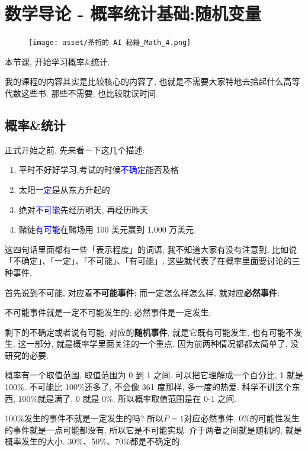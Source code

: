\chapter{数学导论 - 概率统计基础:随机变量}
\begin{figure}[ht]
  \centering
  \texttt{[image: asset/茶桁的 AI 秘籍\_Math\_4.png]}
\end{figure}
\newpage

本节课, 开始学习概率\&统计. 

我的课程的内容其实是比较核心的内容了, 也就是不需要大家特地去拾起什么高等代数这些书. 那些不需要, 也比较耽误时间. 

\section{概率\&统计}

正式开始之前, 先来看一下这几个描述:

\begin{enumerate}
  \item 平时不好好学习,考试的时候\textcolor{blue}{不确定}能否及格
  \item 太阳\textcolor{blue}{一定}是从东方升起的
  \item 绝对\textcolor{blue}{不可能}先经历明天, 再经历昨天
  \item 赌徒\textcolor{blue}{有可能}在赌场用 100 美元赢到 1,000 万美元
\end{enumerate}

这四句话里面都有一些「表示程度」的词语, 我不知道大家有没有注意到, 比如说「不确定」、「一定」、「不可能」、「有可能」, 这些就代表了在概率里面要讨论的三种事件. 

首先说到不可能, 对应着\textbf{不可能事件}; 而一定怎么样怎么样, 就对应\textbf{必然事件}; 

不可能事件就是一定不可能发生的; 必然事件是一定发生; 

剩下的不确定或者说有可能, 对应的\textbf{随机事件}, 就是它既有可能发生, 也有可能不发生. 这一部分, 就是概率学里面关注的一个重点. 因为前两种情况都都太简单了, 没研究的必要. 

概率有一个取值范围, 取值范围为 0 到 1 之间. 可以把它理解成一个百分比, 1 就是 100\%. 不可能比 100\%还多了, 不会像 361 度那样, 多一度的热爱. 科学不讲这个东西, 100\%就是满了, 0 就是 0\%. 所以概率取值范围是在 0-1 之间. 

100\%发生的事件不就是一定发生的吗? 所以$P=1$对应必然事件. 0\%的可能性发生的事件就是一点可能都没有, 所以它是不可能实现. 介于两者之间就是随机的, 就是概率发生的大小. 30\%、50\%、70\%都是不确定的. 

